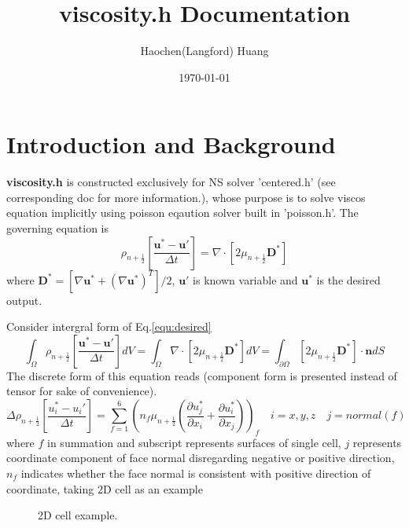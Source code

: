 \documentclass[a4paper]{article}
\title{viscosity.h Documentation}
\author{Haochen(Langford) Huang}
\date{\today}
\begin{document}
\maketitle

\section{Introduction and Background}
\textbf{viscosity.h} is constructed exclusively for NS solver 'centered.h' (see corresponding doc for more information.), whose purpose is to solve viscos equation implicitly using poisson eqaution solver built in 'poisson.h'. The governing equation is 
\begin{equation}\label{equ:desired}
  \rho_{n+ \frac{1}{2}}[ \frac{ \mathbf{u}^*- \mathbf{u}'}{\Delta t}] = \nabla\cdot [2\mu_{n+ \frac{1}{2}} \mathbf{D}^*]
\end{equation}
where $ \mathbf{D}^* = [\nabla \mathbf{u}^*+ (\nabla \mathbf{u}^*)^T]/2$, $ \mathbf{u}'$ is known variable and $ \mathbf{u}^*$ is the desired output.\par
Consider intergral form of Eq.\ref{equ:desired}
\begin{equation}
  \int_{\Omega}\rho_{n+ \frac{1}{2}} [ \frac{ \mathbf{u}^*- \mathbf{u}'}{\Delta t}]dV = \int_{\Omega}\nabla\cdot[2\mu_{n+ \frac{1}{2}} \mathbf{D}^*] dV = \int_{\partial \Omega} [2\mu_{n+ \frac{1}{2}} \mathbf{D}^*]\cdot \mathbf{n}dS
\end{equation}
The discrete form of this equation reads (component form is presented instead of tensor for sake of convenience).
\begin{equation}\label{equ:discrete}
  \Delta \rho_{n+ \frac{1}{2}} [ \frac{u_i^*-u_i'}{\Delta t} ] = \sum_{f = 1}^6(n_f \mu_{n+ \frac{1}{2}}( \frac{\partial u_j^*}{\partial x_i}+ \frac{\partial u_i^*}{\partial x_j}))_f \quad i= x,y,z\quad j = normal(f)
\end{equation}
where $f$ in summation and subscript represents surfaces of single cell, $j$ represents coordinate component of face normal disregarding negative or positive direction, $n_f$ indicates whether the face normal is consistent with positive direction of coordinate, taking 2D cell as an example
\begin{figure}[H]
    \centering
    \caption{2D cell example.}
    \label{fig:2Dexample}
\end{figure}
\end{document}
